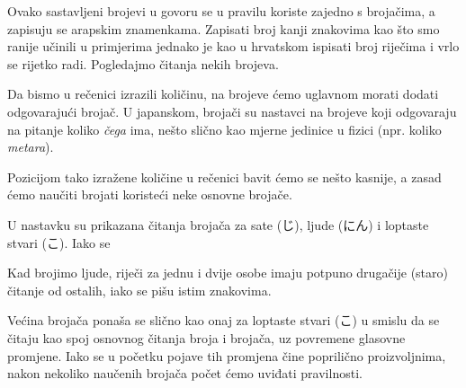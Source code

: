 
	\vspace{5pt}
	Ovako sastavljeni brojevi u govoru se u pravilu koriste zajedno s brojačima, a zapisuju se arapskim znamenkama. Zapisati broj kanji znakovima kao što smo ranije učinili u primjerima jednako je kao u hrvatskom ispisati broj riječima i vrlo se rijetko radi. Pogledajmo čitanja nekih brojeva.
	
	\begin{reibun}
	\end{reibun}

	
	Da bismo u rečenici izrazili količinu, na brojeve ćemo uglavnom morati dodati odgovarajući brojač. U japanskom, brojači su nastavci na brojeve koji odgovaraju na pitanje koliko \textit{čega} ima, nešto slično kao mjerne jedinice u fizici (npr. koliko \textit{metara}).
	
	Pozicijom tako izražene količine u rečenici bavit ćemo se nešto kasnije, a zasad ćemo naučiti brojati koristeći neke osnovne brojače.
	
	\newpage
	
	U nastavku su prikazana čitanja brojača za sate (じ), ljude (にん) i loptaste stvari (こ). Iako se 
	
	Kad brojimo ljude, riječi za jednu i dvije osobe imaju potpuno drugačije (staro) čitanje od ostalih, iako se pišu istim znakovima.
	
	Većina brojača ponaša se slično kao onaj za loptaste stvari (こ) u smislu da se čitaju kao spoj osnovnog čitanja broja i brojača, uz povremene glasovne promjene. Iako se u početku pojave tih promjena čine poprilično proizvoljnima, nakon nekoliko naučenih brojača počet ćemo uviđati pravilnosti.
	
